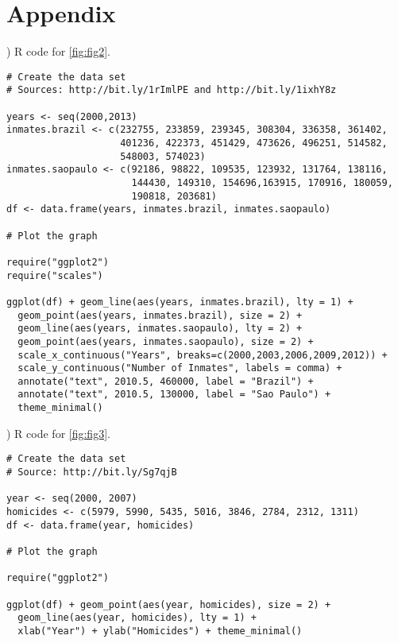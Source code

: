 
\chapter{Appendix}
\label{sec:appendix}


) R code for \autoref{fig:fig2}.

{\footnotesize
\begin{verbatim}
# Create the data set
# Sources: http://bit.ly/1rImlPE and http://bit.ly/1ixhY8z

years <- seq(2000,2013)
inmates.brazil <- c(232755, 233859, 239345, 308304, 336358, 361402,
                    401236, 422373, 451429, 473626, 496251, 514582,
                    548003, 574023)
inmates.saopaulo <- c(92186, 98822, 109535, 123932, 131764, 138116,
                      144430, 149310, 154696,163915, 170916, 180059,
                      190818, 203681)
df <- data.frame(years, inmates.brazil, inmates.saopaulo)

# Plot the graph

require("ggplot2")
require("scales")

ggplot(df) + geom_line(aes(years, inmates.brazil), lty = 1) + 
  geom_point(aes(years, inmates.brazil), size = 2) +  
  geom_line(aes(years, inmates.saopaulo), lty = 2) +
  geom_point(aes(years, inmates.saopaulo), size = 2) + 
  scale_x_continuous("Years", breaks=c(2000,2003,2006,2009,2012)) +
  scale_y_continuous("Number of Inmates", labels = comma) +
  annotate("text", 2010.5, 460000, label = "Brazil") +
  annotate("text", 2010.5, 130000, label = "Sao Paulo") +
  theme_minimal()
\end{verbatim}
}

\newpage

) R code for \autoref{fig:fig3}.

{\footnotesize
\begin{verbatim}
# Create the data set
# Source: http://bit.ly/Sg7qjB

year <- seq(2000, 2007)
homicides <- c(5979, 5990, 5435, 5016, 3846, 2784, 2312, 1311)
df <- data.frame(year, homicides)

# Plot the graph

require("ggplot2")

ggplot(df) + geom_point(aes(year, homicides), size = 2) + 
  geom_line(aes(year, homicides), lty = 1) +
  xlab("Year") + ylab("Homicides") + theme_minimal()
\end{verbatim}
}

